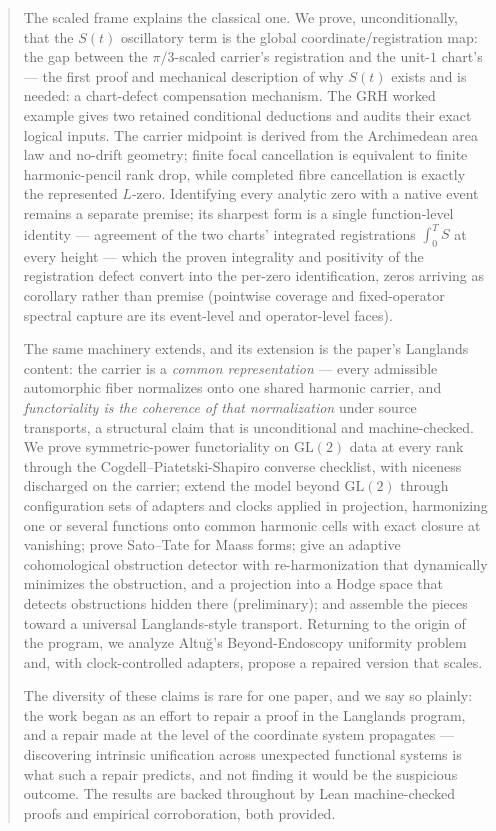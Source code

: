 \documentclass[11pt]{article}
\theoremstyle{definition}
\begin{document}
\begin{abstract}
The scaled frame explains the classical one. We prove, unconditionally, that
the $S(t)$ oscillatory term is the global coordinate/registration map: the
gap between the $\pi/3$-scaled carrier's
registration and the unit-$1$ chart's --- the first proof and mechanical
description of why $S(t)$ exists and is needed: a chart-defect compensation
mechanism.  The GRH worked example gives two retained conditional deductions
and audits their exact logical inputs.  The carrier midpoint is derived from
the Archimedean area law and no-drift geometry; finite focal cancellation is
equivalent to finite harmonic-pencil rank drop, while completed fibre
cancellation is exactly the represented $L$-zero.  Identifying every analytic
zero with a native event remains a separate premise; its sharpest form is a
single function-level identity --- agreement of the two charts' integrated
registrations $\int_0^T S$ at every height --- which the proven integrality
and positivity of the registration defect convert into the per-zero
identification, zeros arriving as corollary rather than premise (pointwise
coverage and fixed-operator spectral capture are its event-level and
operator-level faces).

The same machinery extends, and its extension is the paper's Langlands
content: the carrier is a \emph{common representation} --- every admissible
automorphic fiber normalizes onto one shared harmonic carrier, and
\emph{functoriality is the coherence of that normalization} under source
transports, a structural claim that is unconditional and machine-checked. We
prove symmetric-power functoriality on
$\mathrm{GL}(2)$ data at every rank through the Cogdell--Piatetski-Shapiro
converse checklist, with niceness discharged on the carrier; extend the model
beyond $\mathrm{GL}(2)$ through configuration sets of adapters and clocks
applied in projection, harmonizing one or several functions onto common
harmonic cells with exact closure at vanishing; prove Sato--Tate for Maass
forms; give an adaptive cohomological obstruction detector with
re-harmonization that dynamically minimizes the obstruction, and a projection
into a Hodge space that detects obstructions hidden there (preliminary); and assemble the
pieces toward a universal Langlands-style transport. Returning to the origin
of the program, we analyze Altu\u{g}'s Beyond-Endoscopy uniformity problem
and, with clock-controlled adapters, propose a repaired version that scales.

The diversity of these claims is rare for one paper, and we say so plainly:
the work began as an effort to repair a proof in the Langlands program, and a
repair made at the level of the coordinate system propagates --- discovering
intrinsic unification across unexpected functional systems is what such a
repair predicts, and not finding it would be the suspicious outcome. The
results are backed throughout by Lean machine-checked proofs and empirical
corroboration, both provided.
\end{abstract}
\end{document}
